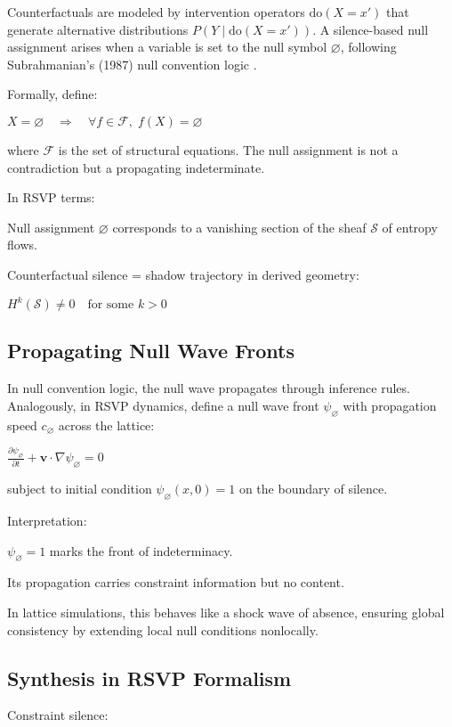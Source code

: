 \documentclass{article}
\begin{document}
Counterfactuals are modeled by intervention operators $\mathrm{do}(X=x')$ that generate alternative distributions $P(Y \mid \mathrm{do}(X=x'))$. A silence-based null assignment arises when a variable is set to the null symbol $\varnothing$, following Subrahmanian’s (1987) null convention logic \citep{Subrahmanian1987}.

Formally, define:

$X = \varnothing \quad \Rightarrow \quad \forall f \in \mathcal{F}, \; f(X) = \varnothing$

where $\mathcal{F}$ is the set of structural equations. The null assignment is not a contradiction but a propagating indeterminate.

In RSVP terms:

Null assignment $\varnothing$ corresponds to a vanishing section of the sheaf $\mathcal{S}$ of entropy flows.

Counterfactual silence = shadow trajectory in derived geometry:

$H^k(\mathcal{S}) \neq 0 \quad \text{for some } k > 0$

\subsection{Propagating Null Wave Fronts}

In null convention logic, the null wave propagates through inference rules. Analogously, in RSVP dynamics, define a null wave front $\psi_{\varnothing}$ with propagation speed $c_\varnothing$ across the lattice:

$\frac{\partial \psi_{\varnothing}}{\partial t} + \mathbf{v} \cdot \nabla \psi_{\varnothing} = 0$

subject to initial condition $\psi_{\varnothing}(x,0) = 1$ on the boundary of silence.

Interpretation:

$\psi_{\varnothing} = 1$ marks the front of indeterminacy.

Its propagation carries constraint information but no content.

In lattice simulations, this behaves like a shock wave of absence, ensuring global consistency by extending local null conditions nonlocally.

\subsection{Synthesis in RSVP Formalism}

Constraint silence:
\end{document}
